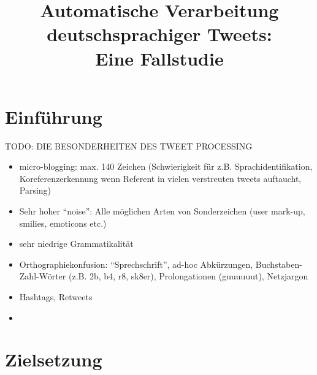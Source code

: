 \documentclass[11pt]{article}
\title{Automatische Verarbeitung deutschsprachiger Tweets:\\ Eine Fallstudie}
\author{}
\date{}
\begin{document}
\maketitle

\thispagestyle{empty}




\section{Einführung}

TODO: DIE BESONDERHEITEN DES TWEET PROCESSING
\begin{itemize}
  \item micro-blogging: max. 140 Zeichen (Schwierigkeit für z.B.
  Sprachidentifikation, Koreferenzerkennung wenn Referent in vielen verstreuten
  tweets auftaucht, Parsing)
  \item Sehr hoher ``noise'': Alle möglichen Arten von Sonderzeichen (user
  mark-up, smilies, emoticons etc.)
  \item sehr niedrige Grammatikalität
  \item Orthographiekonfusion: ``Sprechschrift'', ad-hoc Abkürzungen,
  Buchstaben-Zahl-Wörter (z.B. 2b, b4, r8, sk8er), Prolongationen (guuuuuut),
  Netzjargon
  \item Hashtags, Retweets
  \item 
\end{itemize}


\section{Zielsetzung}
\end{document}
